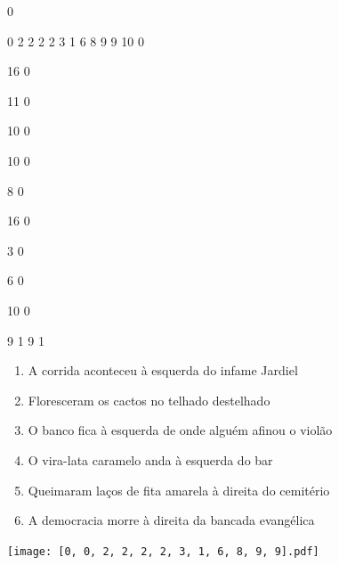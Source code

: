 \documentclass[12pt]{article}
\begin{document}
		\vfill  
		  
{
	0	%

	0	%
	2	%
	2	%
	2	%
	2	%
	3	%
	1	%
	6	%
	8	%
	9	%
	9	%
	10	%
	0	%

	16	%
	0	%

	11	%
	0	%

	10	%
	0	%

	10	%
	0	%

	8	%
	0	%

	16	%
	0	%

	3	%
	0	%

	6	%
	0	%

	10	%
	0	%

	9	%
	1	%
	9	%
	1	%
}	  
		    	

		 

\pagebreak


	\begin{enumerate}
		  \sffamily %
		  \large %


\vfill \item
A corrida aconteceu	%
à esquerda
do infame Jardiel	%

\vfill \item
Floresceram os cactos	%
no telhado destelhado	%

\vfill \item
O banco fica	%
à esquerda
de onde alguém afinou o violão	%

\vfill \item
O vira-lata caramelo anda	%
à esquerda
do bar	%

\vfill \item
Queimaram laços de fita amarela	%
à direita
do cemitério	%

\vfill \item
A democracia morre	%
à direita
da bancada evangélica	%
	\end{enumerate}
		  
		  \hfill

		  \vfill

\texttt{[image: [0, 0, 2, 2, 2, 2, 3, 1, 6, 8, 9, 9].pdf]}


	\hfill	  	  

\end{document}
